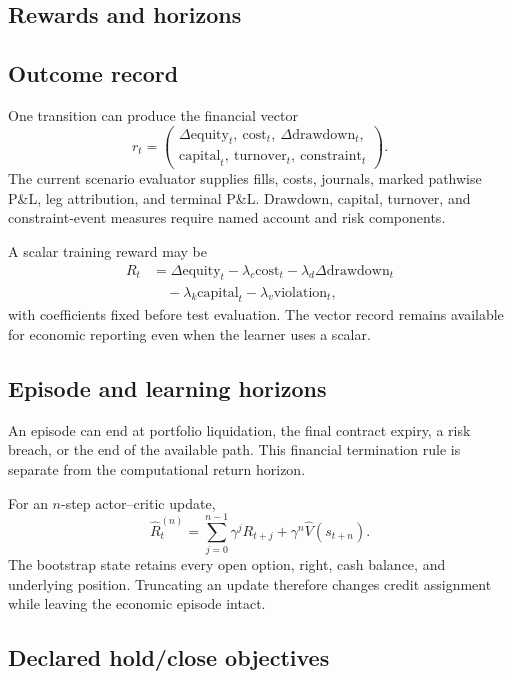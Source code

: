 \documentclass{strategynet-journal}
\begin{document}
\begin{SNcolumns}
\section{Rewards and horizons}
\label{sec:reward}

\subsection{Outcome record}

One transition can produce the financial vector
\[
  r_t=\left(
  \begin{gathered}
    \Delta\mathrm{equity}_t,\ \mathrm{cost}_t,
      \ \Delta\mathrm{drawdown}_t,\\
    \mathrm{capital}_t,\ \mathrm{turnover}_t,
      \ \mathrm{constraint}_t
  \end{gathered}
  \right).
\]
The current scenario evaluator supplies fills, costs, journals, marked pathwise
P\&L, leg attribution, and terminal P\&L.  Drawdown, capital, turnover, and
constraint-event measures require named account and risk components.

A scalar training reward may be
\[
\begin{aligned}
  R_t
  &=\Delta\mathrm{equity}_t
   -\lambda_c\mathrm{cost}_t
   -\lambda_d\Delta\mathrm{drawdown}_t\\
  &\quad
   -\lambda_k\mathrm{capital}_t
   -\lambda_v\mathrm{violation}_t,
\end{aligned}
\]
with coefficients fixed before test evaluation.  The vector record remains
available for economic reporting even when the learner uses a scalar.

\subsection{Episode and learning horizons}

An episode can end at portfolio liquidation, the final contract expiry, a
risk breach, or the end of the available path.  This financial termination
rule is separate from the computational return horizon.

For an \(n\)-step actor--critic update,
\[
  \widehat R_t^{(n)}
  =\sum_{j=0}^{n-1}\gamma^jR_{t+j}
   +\gamma^n\widehat V(s_{t+n}).
\]
The bootstrap state retains every open option, right, cash balance, and
underlying position.  Truncating an update therefore changes credit
assignment while leaving the economic episode intact.

\subsection{Declared hold/close objectives}
\label{sec:declared-objectives}


\end{SNcolumns}
\end{document}
